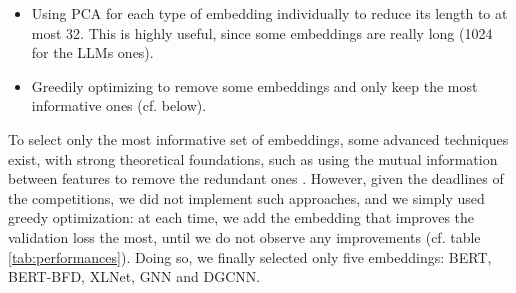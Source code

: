 \documentclass[final]{cvpr}
\begin{document}
\begin{itemize}
    \item Using PCA for each type of embedding individually to reduce its length to at most 32. This is highly useful, since some embeddings are really long (1024 for the LLMs ones).
    \item Greedily optimizing to remove some embeddings and only keep the most informative ones (cf. below).
\end{itemize}

To select only the most informative set of embeddings, some advanced techniques exist, with strong theoretical foundations, such as using the mutual information between features to remove the redundant ones \cite{mutualInfo}. However, given the deadlines of the competitions, we did not implement such approaches, and we simply used greedy optimization: at each time, we add the embedding that improves the validation loss the most, until we do not observe any improvements (cf. table \ref{tab:performances}). Doing so, we finally selected only five embeddings: BERT, BERT-BFD, XLNet, GNN and DGCNN.
\end{document}
